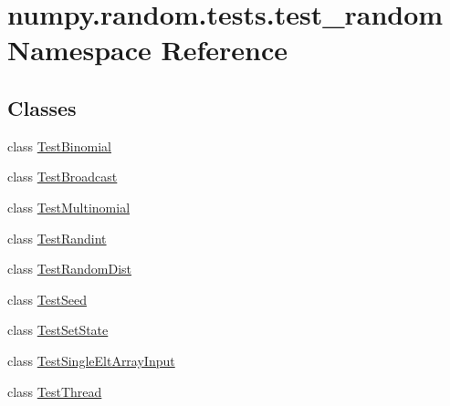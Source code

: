 \hypertarget{namespacenumpy_1_1random_1_1tests_1_1test__random}{}\section{numpy.\+random.\+tests.\+test\+\_\+random Namespace Reference}
\label{namespacenumpy_1_1random_1_1tests_1_1test__random}
\subsection*{Classes}
\begin{DoxyCompactItemize}
\item 
class \hyperlink{classnumpy_1_1random_1_1tests_1_1test__random_1_1TestBinomial}{Test\+Binomial}
\item 
class \hyperlink{classnumpy_1_1random_1_1tests_1_1test__random_1_1TestBroadcast}{Test\+Broadcast}
\item 
class \hyperlink{classnumpy_1_1random_1_1tests_1_1test__random_1_1TestMultinomial}{Test\+Multinomial}
\item 
class \hyperlink{classnumpy_1_1random_1_1tests_1_1test__random_1_1TestRandint}{Test\+Randint}
\item 
class \hyperlink{classnumpy_1_1random_1_1tests_1_1test__random_1_1TestRandomDist}{Test\+Random\+Dist}
\item 
class \hyperlink{classnumpy_1_1random_1_1tests_1_1test__random_1_1TestSeed}{Test\+Seed}
\item 
class \hyperlink{classnumpy_1_1random_1_1tests_1_1test__random_1_1TestSetState}{Test\+Set\+State}
\item 
class \hyperlink{classnumpy_1_1random_1_1tests_1_1test__random_1_1TestSingleEltArrayInput}{Test\+Single\+Elt\+Array\+Input}
\item 
class \hyperlink{classnumpy_1_1random_1_1tests_1_1test__random_1_1TestThread}{Test\+Thread}
\end{DoxyCompactItemize}
